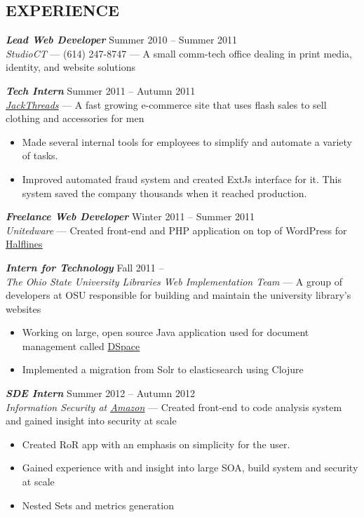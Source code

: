 \documentclass[line,letterpaper]{resume}
\begin{document}
\begin{resume}
    \vspace{-6pt}

    \section{\uppercase{Experience}} {\sl\textbf{Lead Web Developer}} \hfill
    Summer 2010 -- Summer 2011\\
    \emph{StudioCT} --- (614) 247-8747 --- A small comm-tech office dealing
    in print media, identity, and website solutions

    {\sl\textbf{Tech Intern}} \hfill Summer 2011 -- Autumn 2011 \\
    \emph{\underline{\href{http://www.jackthreads.com/}{JackThreads}}}
    --- A fast growing e-commerce site that uses flash sales to sell clothing and
    accessories for men
    \begin{itemize}
        \item Made several internal tools for employees to simplify and automate
            a variety of tasks.
        \item Improved automated fraud system and created ExtJs interface for
            it. This system saved the company thousands when it reached
            production.
    \end{itemize}

    {\sl\textbf{Freelance Web Developer}} \hfill Winter 2011 -- Summer 2011\\
    \emph{Unitedware} --- Created front-end and PHP application on top of
    WordPress for \underline{\href{http://halflines.com/}{Halflines}}

    {\sl\textbf{Intern for Technology}} \hfill Fall 2011 -- \\
    \emph{The Ohio State University Libraries Web Implementation Team} --- A
    group of developers at OSU responsible for building and maintain the
    university library's websites
    \begin{itemize}
        \item Working on large, open source Java application used for document
            management called
            \underline{\href{https://github.com/osulibraries/DSpaceOSUKB/wiki}{DSpace}}
        \item Implemented a migration from Solr to elasticsearch using Clojure
    \end{itemize}

    {\sl\textbf{SDE Intern}} \hfill Summer 2012 -- Autumn 2012\\
    \emph{Information Security at
    \underline{\href{http://www.amazon.com/}{Amazon}}} --- Created front-end to
    code analysis system and gained insight into security at scale
    \begin{itemize}
        \item Created RoR app with an emphasis on simplicity for the user.
        \item Gained experience with and insight into large SOA, build system
            and security at scale
        \item Nested Sets and metrics generation
    \end{itemize}


\end{resume}
\end{document}
